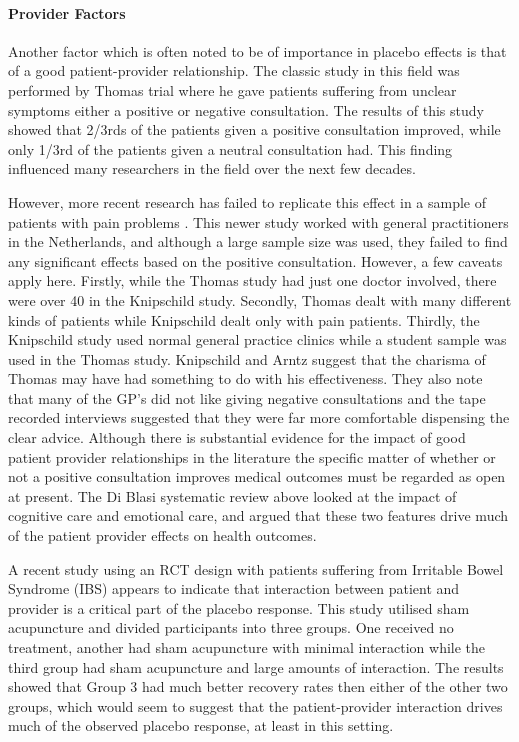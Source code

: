 \paragraph{Provider Factors}

Another factor which is often noted to be of importance in placebo effects is that of a good patient-provider relationship. The classic study in this field was performed by Thomas \cite{thomas1987general} trial where he gave patients suffering from unclear symptoms either a positive or negative consultation. The results of this study showed that 2/3rds of the patients given a positive consultation improved, while only 1/3rd of the patients given a neutral consultation had. This finding influenced many researchers in the field over the next few decades. 

However, more recent research has failed to replicate this effect in a sample of patients with pain problems \cite{Knipschild2005}. This newer study worked with general practitioners in the Netherlands, and although a large sample size was used, they failed to find any significant effects based on the positive consultation. However, a few caveats apply here. Firstly, while the Thomas study had just one doctor involved, there were over 40 in the Knipschild study. Secondly, Thomas dealt with many different kinds of patients while Knipschild dealt only with pain patients. Thirdly, the Knipschild study used normal general practice clinics while a student sample was used in the Thomas study. Knipschild and Arntz suggest that the charisma of Thomas may have had something to do with his effectiveness. They also note that many of the GP's did not like giving negative consultations and the tape recorded interviews suggested that they were far more comfortable dispensing the clear advice.  Although there is substantial evidence for the impact of good patient provider relationships in the literature \cite{DiBlasi2001} the specific matter of whether or not a positive consultation improves medical outcomes must be regarded as open at present. The Di Blasi systematic review above looked at the impact of cognitive care and emotional care, and argued that these two features drive much of the patient provider effects on health outcomes. 

A recent study \cite{Kaptchuk2008}  using an RCT design with patients suffering from Irritable Bowel Syndrome (IBS) appears to indicate that interaction between patient and provider is a critical part of the placebo response. This study utilised sham acupuncture and divided participants into three groups. One received no treatment, another had sham acupuncture with minimal interaction while the third group had sham acupuncture and large amounts of interaction. The results showed that Group 3 had much better recovery rates then either of the other two groups, which would seem to suggest that the patient-provider interaction drives much of the observed placebo response, at least in this setting.  

